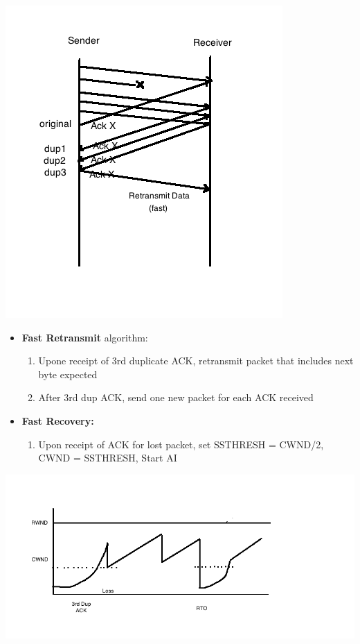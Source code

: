 \documentclass[11pt]{article}
\begin{document}
\includegraphics[width=.9\linewidth]{diagrams/Reno.png}

\begin{itemize}
\item \textbf{Fast Retransmit} algorithm:
\begin{enumerate}
\item Upone receipt of 3rd duplicate ACK, retransmit packet that
includes next byte expected
\item After 3rd dup ACK, send one new packet for each ACK received
\end{enumerate}

\item \textbf{Fast Recovery:}
\begin{enumerate}
\item Upon receipt of ACK for lost packet, set SSTHRESH = CWND/2, CWND
= SSTHRESH, Start AI
\end{enumerate}
\end{itemize}

\includegraphics[width=.9\linewidth]{diagrams/Reno_2.png}
\end{document}
